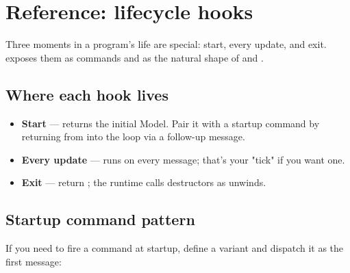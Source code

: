 \chapter{Reference: lifecycle hooks}
\label{ch:refman-lifecycle}

\begin{aside}
Three moments in a program's life are special: start, every
update, and exit. \maya{} exposes them as commands and as
the natural shape of  and .
\end{aside}

\section{Where each hook lives}

\begin{itemize}[leftmargin=*]
  \item \textbf{Start} —  returns the initial
    Model. Pair it with a startup command by returning from
     into the loop via a follow-up message.
  \item \textbf{Every update} —  runs on
    every message; that's your "tick" if you want one.
  \item \textbf{Exit} — return ; the
    runtime calls destructors as  unwinds.
\end{itemize}

\section{Startup command pattern}

If you need to fire a command at startup, define a
 variant and dispatch it as the first message:

